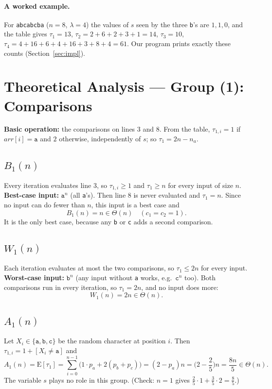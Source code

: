 \documentclass[11pt]{article}
\theoremstyle{remark}
\newcommand{\E}{\mathrm{E}}
\newcommand{\ta}{\texttt{a}}
\newcommand{\tb}{\texttt{b}}
\newcommand{\tc}{\texttt{c}}
\begin{document}
\paragraph{A worked example.} For \texttt{abcabcba} ($n=8$, $\lambda=4$) the values of $s$ seen by the three \tb's are
$1,1,0$, and the table gives $\tau_1=13$, $\tau_2=2+6+2+3+1=14$, $\tau_3=10$,
$\tau_4=4+16+6+4+16+3+8+4=61$. Our program prints exactly these counts (Section~\ref{sec:impl}).

\section{Theoretical Analysis --- Group (1): Comparisons}
\textbf{Basic operation:} the comparisons on lines 3 and 8. From the table, $\tau_{1,i}=1$ if $arr[i]=\ta$ and $2$
otherwise, independently of $s$; so $\tau_1 = 2n-n_a$.

\subsection{$B_1(n)$}
Every iteration evaluates line 3, so $\tau_{1,i}\ge 1$ and $\tau_1\ge n$ for every input of size $n$.
\textbf{Best-case input:} $\ta^n$ (all \ta's). Then line 8 is never evaluated and $\tau_1=n$. Since no input can do
fewer than $n$, this input is a best case and
\[
B_1(n)=n\in\Theta(n)\quad(c_1=c_2=1).
\]
It is the only best case, because any \tb{} or \tc{} adds a second comparison.

\subsection{$W_1(n)$}
Each iteration evaluates at most the two comparisons, so $\tau_1\le 2n$ for every input.
\textbf{Worst-case input:} $\tb^n$ (any input without \ta{} works, e.g.\ $\tc^n$ too). Both comparisons run in every
iteration, so $\tau_1=2n$, and no input does more:
\[
W_1(n) = 2n\in\Theta(n).
\]

\subsection{$A_1(n)$}
Let $X_i\in\{\ta,\tb,\tc\}$ be the random character at position $i$. Then $\tau_{1,i}=1+[X_i\ne \ta]$ and
\[
A_1(n)=\E[\tau_1]=\sum_{i=0}^{n-1}\big(1\cdot p_a + 2(p_b+p_c)\big)=(2-p_a)n = \Big(2-\frac25\Big)n=\frac{8n}{5}\in\Theta(n).
\]
The variable $s$ plays no role in this group. (Check: $n=1$ gives $\frac25\cdot1+\frac35\cdot2=\frac85$.)
\end{document}
